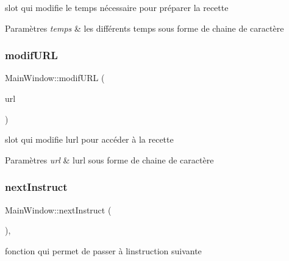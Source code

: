 slot qui modifie le temps nécessaire pour préparer la recette 


\begin{DoxyParams}{Paramètres}
{\em temps} & les différents temps sous forme de chaine de caractère \\
\hline
\end{DoxyParams}
\mbox{\label{classMainWindow_ac1923d4f0d0f7f91deeac773e2cb16df}} 
\subsubsection{\texorpdfstring{modif\+U\+RL}{modifURL}}
{\footnotesize\ttfamily Main\+Window\+::modif\+U\+RL (\begin{DoxyParamCaption}\item[{Q\+String}]{url }\end{DoxyParamCaption})\hspace{0.3cm}{\ttfamily [slot]}}



slot qui modifie l\textquotesingle{}url pour accéder à la recette 


\begin{DoxyParams}{Paramètres}
{\em url} & l\textquotesingle{}url sous forme de chaine de caractère \\
\hline
\end{DoxyParams}
\mbox{\label{classMainWindow_a0b79b7ea071fc3a4baa45f8394052ffd}} 
\subsubsection{\texorpdfstring{next\+Instruct}{nextInstruct}}
{\footnotesize\ttfamily Main\+Window\+::next\+Instruct (\begin{DoxyParamCaption}{ }\end{DoxyParamCaption})\hspace{0.3cm}{\ttfamily [private]}, {\ttfamily [slot]}}



fonction qui permet de passer à l\textquotesingle{}instruction suivante 

\mbox{\label{classMainWindow_aacde03c39958646fddec981b89d37238}} 

